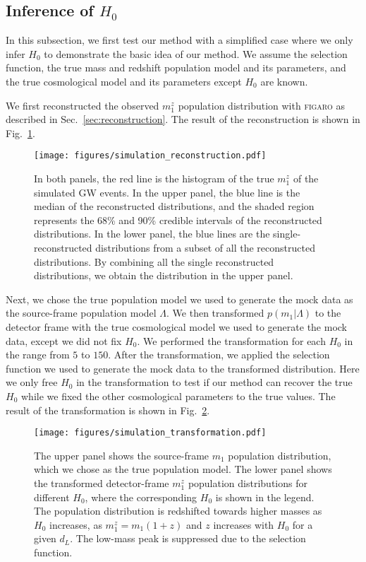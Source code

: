 \documentclass[sn-aps, pdflatex]{sn-jnl}
\begin{document}
\subsection{Inference of $H_0$}
\label{sec:inference_H0}

In this subsection, we first test our method with a simplified case where we only infer $H_0$ to demonstrate the basic idea of our method.
We assume the selection function, the true mass and redshift population model and its parameters, and the true cosmological model and its parameters except $H_0$ are known.

We first reconstructed the observed $m^z_1$ population distribution with \textsc{figaro} as described in Sec.~\ref{sec:reconstruction}.
The result of the reconstruction is shown in Fig.~\ref{fig:simulation_reconstruction}.
\begin{figure}[htbp]
    \texttt{[image: figures/simulation\_reconstruction.pdf]}
    \caption{
        In both panels, the red line is the histogram of the true $m^z_1$ of the simulated \ac{GW} events.
        In the upper panel, the blue line is the median of the reconstructed distributions, and the shaded region represents the 68\% and 90\% credible intervals of the reconstructed distributions.
        In the lower panel, the blue lines are the single-reconstructed distributions from a subset of all the reconstructed distributions.
        By combining all the single reconstructed distributions, we obtain the distribution in the upper panel.
    }
    \label{fig:simulation_reconstruction}
\end{figure}

Next, we chose the true population model we used to generate the mock data as the source-frame population model $\Lambda$.
We then transformed $p(m_1|\Lambda)$ to the detector frame with the true cosmological model we used to generate the mock data, except we did not fix $H_0$.
We performed the transformation for each $H_0$ in the range from $5$ to $150$.
After the transformation, we applied the selection function we used to generate the mock data to the transformed distribution.
Here we only free $H_0$ in the transformation to test if our method can recover the true $H_0$ while we fixed the other cosmological parameters to the true values.
The result of the transformation is shown in Fig.~\ref{fig:simulation_transformation}.
\begin{figure}[htbp]
    \texttt{[image: figures/simulation\_transformation.pdf]}
    \caption{
        The upper panel shows the source-frame $m_1$ population distribution, which we chose as the true population model.
        The lower panel shows the transformed detector-frame $m^z_1$ population distributions for different $H_0$, where the corresponding $H_0$ is shown in the legend.
        The population distribution is redshifted towards higher masses as $H_0$ increases, as $m^z_1 = m_1(1+z)$ and $z$ increases with $H_0$ for a given $d_L$.
        The low-mass peak is suppressed due to the selection function.
    }
    \label{fig:simulation_transformation}
\end{figure}
\end{document}
